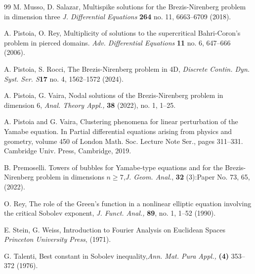 \documentclass[11pt,a4paper]{amsart}
\theoremstyle{definition}
\renewcommand{\(}{\left(}
\renewcommand{\)}{\right)}
\begin{document}
\begin{thebibliography}{99}
M. Musso, D. Salazar, 
Multispike solutions for the Brezis-Nirenberg problem in dimension three
{\it  J. Differential Equations} {\bf 264}  no. 11, 6663--6709 (2018).

 A. Pistoia, O. Rey, Multiplicity of solutions to the supercritical Bahri-Coron's problem in pierced domains. {\it Adv. Differential Equations} {\bf 11}  no. 6, 647–666 (2006).

A. Pistoia, S. Rocci, The Brezis-Nirenberg problem in 4D, {\it Discrete Contin. Dyn. Syst. Ser. S}{\bf 17}  no. 4, 1562--1572 (2024).

A. Pistoia, G. Vaira, Nodal solutions of the Brezis-Nirenberg problem in dimension 6, {\it Anal. Theory Appl.,} {\bf 38} (2022), no. 1, 1--25.

A. Pistoia and G. Vaira, Clustering phenomena for linear perturbation of the Yamabe
equation. In Partial diﬀerential equations arising from physics and geometry, volume 450 of
London Math. Soc. Lecture Note Ser., pages 311–331. Cambridge Univ. Press, Cambridge,
2019.

 B. Premoselli. Towers of bubbles for Yamabe-type equations and for the Brezis-Nirenberg
problem in dimensions $n \geq 7$,{\it J. Geom. Anal.}, {\bf32} (3):Paper No. 73, 65, (2022).

O. Rey, The role of the Green’s function in a nonlinear elliptic equation involving the critical Sobolev exponent, {\it J. Funct. Anal.,} {\bf 89}, no. 1, 1--52  (1990).

E. Stein, G. Weiss, Introduction to Fourier Analysis on Euclidean Spaces {\it Princeton University Press}, (1971).

G. Talenti, Best constant in Sobolev inequality,{\it Ann. Mat. Pura Appl., } {\bf(4)} 353--372  (1976).
\end{thebibliography}
\end{document}

